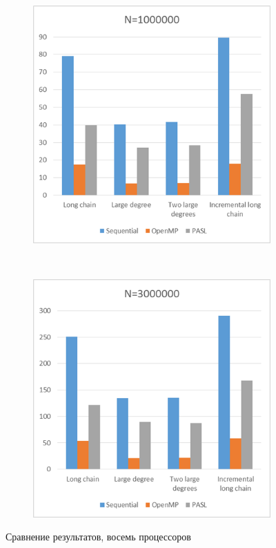 \documentclass[specification,annotation]{itmo-student-thesis}
\begin{document}
\begin{figure}[!ht]
\begin{subfigure}[b]{0.45\textwidth}
\end{subfigure}\\
\begin{subfigure}[b]{0.45\textwidth}
    \includegraphics[width=\textwidth]{pic/results-8-c.png}
\end{subfigure}~~\begin{subfigure}[b]{0.45\textwidth}
    \includegraphics[width=\textwidth]{pic/results-8-d.png}
\end{subfigure}
\caption{Сравнение результатов, восемь процессоров}\label{fig:results-comparison-8}
\end{figure}
\end{document}
